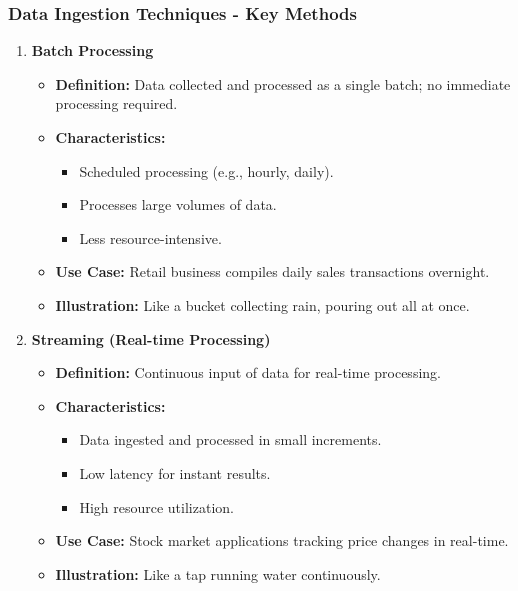\documentclass[aspectratio=169]{beamer}
\begin{document}
\begin{frame}[fragile]
    \frametitle{Data Ingestion Techniques - Key Methods}
    \begin{enumerate}
        \item \textbf{Batch Processing}
            \begin{itemize}
                \item \textbf{Definition:} Data collected and processed as a single batch; no immediate processing required.
                \item \textbf{Characteristics:}
                    \begin{itemize}
                        \item Scheduled processing (e.g., hourly, daily).
                        \item Processes large volumes of data.
                        \item Less resource-intensive.
                    \end{itemize}
                \item \textbf{Use Case:} Retail business compiles daily sales transactions overnight.
                \item \textbf{Illustration:} Like a bucket collecting rain, pouring out all at once.
            \end{itemize}

        \item \textbf{Streaming (Real-time Processing)}
            \begin{itemize}
                \item \textbf{Definition:} Continuous input of data for real-time processing.
                \item \textbf{Characteristics:}
                    \begin{itemize}
                        \item Data ingested and processed in small increments.
                        \item Low latency for instant results.
                        \item High resource utilization.
                    \end{itemize}
                \item \textbf{Use Case:} Stock market applications tracking price changes in real-time.
                \item \textbf{Illustration:} Like a tap running water continuously.
            \end{itemize}
    \end{enumerate}
\end{frame}
\end{document}
